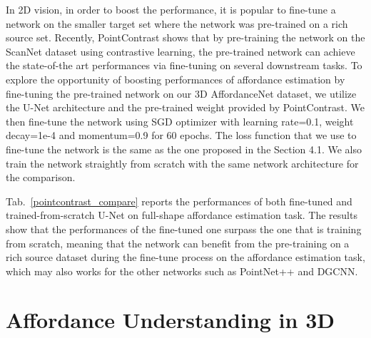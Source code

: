 \documentclass[final]{cvpr}
\begin{document}
\begin{table}[!htb]
\caption{The full-shape affordance estimation performance comparison between the U-Net fine-tuned on our dataset and the U-Net trained from scratch.}
\label{pointcontrast_compare}
\end{table}

In 2D vision, in order to boost the performance, it is popular to fine-tune a network on the smaller target set where the network was pre-trained on a rich source set. Recently, PointContrast shows that by pre-training the network on the ScanNet dataset using contrastive learning, the pre-trained network can achieve the state-of-the art performances via fine-tuning on several downstream tasks. To explore the opportunity of boosting performances of affordance estimation by fine-tuning the pre-trained network on our 3D AffordanceNet dataset, we utilize the U-Net architecture and the pre-trained weight provided by PointContrast. We then fine-tune the network using SGD optimizer with learning rate=0.1, weight decay=1e-4 and momentum=0.9 for 60 epochs. The loss function that we use to fine-tune the network is the same as the one proposed in the Section 4.1. We also train the network straightly from scratch with the same network architecture for the comparison.

Tab.~\ref{pointcontrast_compare} reports the performances of both fine-tuned and trained-from-scratch U-Net on full-shape affordance estimation task. The results show that the performances of the fine-tuned one surpass the one that is training from scratch, meaning that the network can benefit from the pre-training on a rich source dataset during the fine-tune process on the affordance estimation task, which may also works for the other networks such as PointNet++ and DGCNN.



\section{Affordance Understanding in 3D} \label{understanding in 3d}
\end{document}
